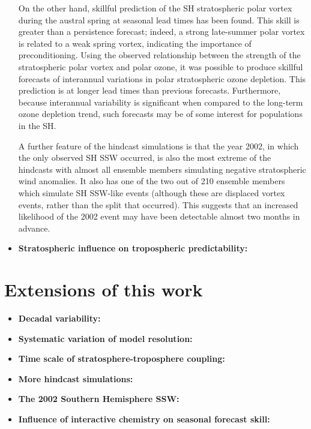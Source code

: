 \begin{itemize}
  On the other hand, skillful prediction of the SH stratospheric polar vortex
  during the austral spring at seasonal lead times has been found. This skill is
  greater than a persistence forecast; indeed, a strong late-summer polar vortex
  is related to a weak spring vortex, indicating the importance of
  preconditioning. Using the observed relationship between the strength of the
  stratospheric polar vortex and polar ozone, it was possible to produce
  skillful forecasts of interannual variations in polar stratospheric ozone
  depletion. This prediction is at longer lead times than previous
  forecasts. Furthermore, because interannual variability is significant when
  compared to the long-term ozone depletion trend, such forecasts may be of some
  interest for populations in the SH.

  A further feature of the hindcast simulations is that the year 2002, in which
  the only observed SH SSW occurred, is also the most extreme of the hindcasts
  with almost all ensemble members simulating negative stratospheric wind
  anomalies. It also has one of the two out of 210 ensemble members which
  simulate SH SSW-like events (although these are displaced vortex events,
  rather than the split that occurred). This suggests that an increased
  likelihood of the 2002 event may have been detectable almost two months in
  advance. 

\item\textbf{Stratospheric influence on tropospheric predictability:}

\end{itemize}

\section{Extensions of this work}

\begin{itemize}
\item\textbf{Decadal variability:}

\item\textbf{Systematic variation of model resolution:}

\item\textbf{Time scale of stratosphere-troposphere coupling:}

\item\textbf{More hindcast simulations:}

\item\textbf{The 2002 Southern Hemisphere SSW:}

\item\textbf{Influence of interactive chemistry on seasonal forecast skill:}

\end{itemize}

